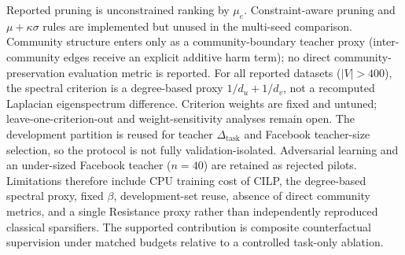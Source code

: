 Reported pruning is unconstrained ranking by $\mu_e$.
Constraint-aware pruning and $\mu{+}\kappa\sigma$ rules are implemented but unused in the multi-seed comparison.
Community structure enters only as a community-boundary teacher proxy (inter-community edges receive an explicit additive harm term); no direct community-preservation evaluation metric is reported.
For all reported datasets ($|V|{>}400$), the spectral criterion is a degree-based proxy $1/d_u+1/d_v$, not a recomputed Laplacian eigenspectrum difference.
Criterion weights are fixed and untuned; leave-one-criterion-out and weight-sensitivity analyses remain open.
The development partition is reused for teacher $\Delta_{\mathrm{task}}$ and Facebook teacher-size selection, so the protocol is not fully validation-isolated.
Adversarial learning and an under-sized Facebook teacher ($n{=}40$) are retained as rejected pilots.
Limitations therefore include CPU training cost of CILP, the degree-based spectral proxy, fixed $\beta$, development-set reuse, absence of direct community metrics, and a single Resistance proxy rather than independently reproduced classical sparsifiers.
The supported contribution is composite counterfactual supervision under matched budgets relative to a controlled task-only ablation.
